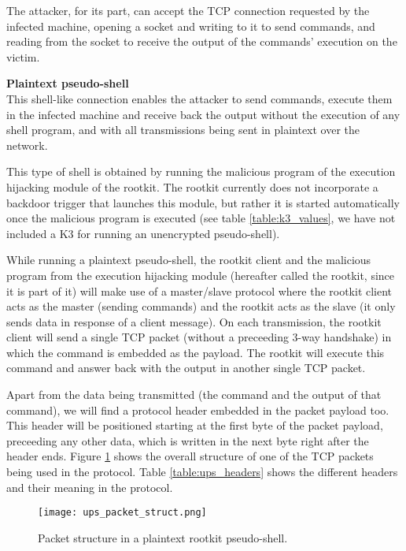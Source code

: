 The attacker, for its part, can accept the TCP connection requested by the infected machine, opening a socket and writing to it to send commands, and reading from the socket to receive the output of the commands' execution on the victim.
 
 
 
\textbf{Plaintext pseudo-shell}\\
This shell-like connection enables the attacker to send commands, execute them in the infected machine and receive back the output without the execution of any shell program, and with all transmissions being sent in plaintext over the network.

This type of shell is obtained by running the malicious program of the execution hijacking module of the rootkit. The rootkit currently does not incorporate a backdoor trigger that launches this module, but rather it is started automatically once the malicious program is executed (see table \ref{table:k3_values}, we have not included a K3 for running an unencrypted pseudo-shell).

While running a plaintext pseudo-shell, the rootkit client and the malicious program from the execution hijacking module (hereafter called the rootkit, since it is part of it) will make use of a master/slave protocol where the rootkit client acts as the master (sending commands) and the rootkit acts as the slave (it only sends data in response of a client message). On each transmission, the rootkit client will send a single TCP packet (without a preceeding 3-way handshake) in which the command is embedded as the payload. The rootkit will execute this command and answer back with the output in another single TCP packet.

Apart from the data being transmitted (the command and the output of that command), we will find a protocol header embedded in the packet payload too. This header will be positioned starting at the first byte of the packet payload, preceeding any other data, which is written in the next byte right after the header ends. Figure \ref{fig:ups_packet_struct} shows the overall structure of one of the TCP packets being used in the protocol. Table \ref{table:ups_headers} shows the different headers and their meaning in the protocol.

\begin{figure}[htbp]
	\centering
	\texttt{[image: ups\_packet\_struct.png]}
	\caption{Packet structure in a plaintext rootkit pseudo-shell.}
	\label{fig:ups_packet_struct}
\end{figure}

